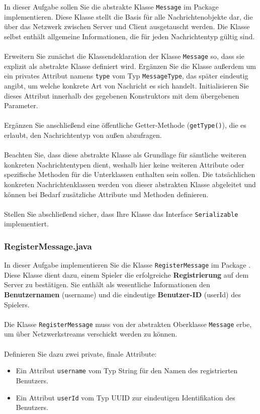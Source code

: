 \documentclass[12pt]{article}
\begin{document}
In dieser Aufgabe sollen Sie die abstrakte Klasse \texttt{Message} im Package  implementieren. 
Diese Klasse stellt die Basis für alle Nachrichtenobjekte dar, die über das Netzwerk zwischen Server und Client ausgetauscht werden. 
Die Klasse selbst enthält allgemeine Informationen, die für jeden Nachrichtentyp gültig sind.
\\ \\
Erweitern Sie zunächst die Klassendeklaration der Klasse \texttt{Message} so, dass sie explizit als abstrakte Klasse definiert wird. 
Ergänzen Sie die Klasse außerdem um ein privates Attribut namens \texttt{type} vom Typ \texttt{MessageType}, 
das später eindeutig angibt, um welche konkrete Art von Nachricht es sich handelt. 
Initialisieren Sie dieses Attribut innerhalb des gegebenen Konstruktors mit dem übergebenen Parameter.
\\ \\
Ergänzen Sie anschließend eine öffentliche Getter-Methode (\texttt{getType()}), 
die es erlaubt, den Nachrichtentyp von außen abzufragen.
\\ \\
Beachten Sie, dass diese abstrakte Klasse als Grundlage für sämtliche weiteren konkreten Nachrichtentypen dient, 
weshalb hier keine weiteren Attribute oder spezifische Methoden für die Unterklassen enthalten sein sollen. 
Die tatsächlichen konkreten Nachrichtenklassen werden von dieser abstrakten Klasse abgeleitet 
und können bei Bedarf zusätzliche Attribute und Methoden definieren.
\\ \\
Stellen Sie abschließend sicher, dass Ihre Klasse das Interface \texttt{Serializable} implementiert.

\subsubsection*{RegisterMessage.java}

In dieser Aufgabe implementieren Sie die Klasse \texttt{RegisterMessage} im Package . 
Diese Klasse dient dazu, einem Spieler die erfolgreiche \textbf{Registrierung} auf dem Server zu bestätigen. 
Sie enthält als wesentliche Informationen den \textbf{Benutzernamen} (username) 
und die eindeutige \textbf{Benutzer-ID} (userId) des Spielers.
\\ \\
Die Klasse \texttt{RegisterMessage} muss von der abstrakten Oberklasse \texttt{Message} erbe, um über Netzwerkstreams verschickt werden zu können.
\\ \\
Definieren Sie dazu zwei private, finale Attribute:
\begin{itemize}
    \item Ein Attribut \texttt{username} vom Typ String für den Namen des registrierten Benutzers.
    \item Ein Attribut \texttt{userId} vom Typ UUID zur eindeutigen Identifikation des Benutzers.
\end{itemize}
\end{document}
